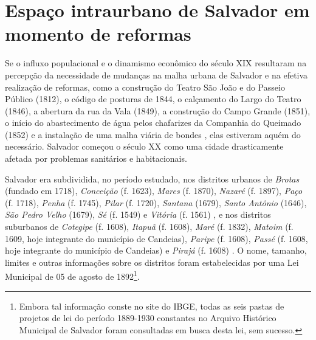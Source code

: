 \section{Espaço intraurbano de Salvador em momento de reformas}\label{sec:1.4}

Se o influxo populacional e o dinamismo econômico do século XIX resultaram na percepção da necessidade de mudanças na malha urbana de Salvador e na efetiva realização de reformas, como a construção do Teatro São João e do Passeio Público (1812), o código de posturas de 1844, o calçamento do Largo do Teatro (1846), a abertura da rua da Vala (1849), a construção do Campo Grande (1851), o início do abastecimento de água pelos chafarizes da Companhia do Queimado (1852) e a instalação de uma malha viária de bondes \cite{fernandesgomes1992, fernandessampaiogomes1999, NASCIMENTO2007, SAMPAIO2005}, elas estiveram aquém do necessário. Salvador começou o século XX como uma cidade drasticamente afetada por problemas sanitários e habitacionais.

Salvador era subdividida, no período estudado, nos distritos urbanos de \textit{Brotas} (fundado em 1718), \textit{Conceição} (f. 1623), \textit{Mares} (f. 1870), \textit{Nazaré} (f. 1897), \textit{Paço} (f. 1718), \textit{Penha} (f. 1745), \textit{Pilar} (f. 1720), \textit{Santana} (1679), \textit{Santo Antônio} (1646), \textit{São Pedro Velho} (1679), \textit{Sé} (f. 1549) e \textit{Vitória} (f. 1561) \cite[259-307]{VASCONCELOS2002}, e nos distritos suburbanos de \textit{Cotegipe} (f. 1608), \textit{Itapuã} (f. 1608), \textit{Maré} (f. 1832), \textit{Matoim} (f. 1609, hoje integrante do município de Candeias), \textit{Paripe} (f. 1608), \textit{Passé} (f. 1608, hoje integrante do município de Candeias) e \textit{Pirajá} (f. 1608) \cite[p.~53-62]{NASCIMENTO2007}. O nome, tamanho, limites e outras informações sobre os distritos foram estabelecidas por uma Lei Municipal de 05 de agosto de 1892\footnote{Embora tal informação conste no site do IBGE, todas as seis pastas de projetos de lei do período 1889-1930 constantes no Arquivo Histórico Municipal de Salvador foram consultadas em busca desta lei, sem sucesso.}.

